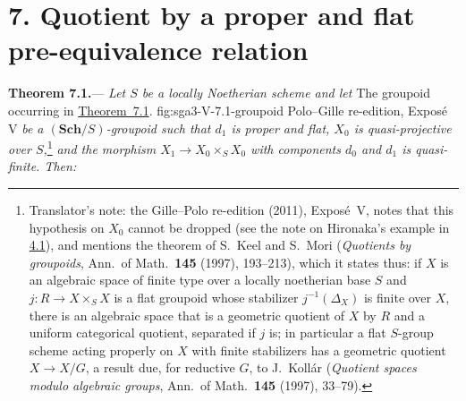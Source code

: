 
\section*{7. Quotient by a proper and flat pre-equivalence relation}
\label{sec:sga3-V-7}

\medskip
{}\label{thm:sga3-V-7.1}%
\noindent\textbf{Theorem 7.1.}---%
\emph{Let \(S\) be a locally Noetherian scheme and let}
  {The groupoid occurring in \hyperref[thm:sga3-V-7.1]{Theorem~7.1}.}
  {fig:sga3-V-7.1-groupoid}
  {Polo--Gille re-edition, Expos\'e V}
\emph{be a \((\mathbf{Sch}/S)\)-groupoid such that \(d_1\) is proper
and flat, \(X_0\) is quasi-projective over \(S\),}\footnote{Translator's note: the Gille--Polo re-edition (2011), Exposé~V, notes
that this hypothesis on \(X_0\) cannot be dropped (see the note on Hironaka's
example in \hyperref[thm:sga3-V-4.1]{4.1}), and mentions the theorem of S.~Keel and S.~Mori
(\emph{Quotients by groupoids}, Ann.\ of Math.\ \textbf{145} (1997), 193--213),
which it states thus: if \(X\) is an algebraic space of finite type over a
locally noetherian base \(S\) and \(j\colon R\to X\times_SX\) is a flat groupoid
whose stabilizer \(j^{-1}(\Delta_X)\) is finite over \(X\), there is an
algebraic space that is a geometric quotient of \(X\) by \(R\) and a uniform
categorical quotient, separated if \(j\) is; in particular a flat \(S\)-group
scheme acting properly on \(X\) with finite stabilizers has a geometric
quotient \(X\to X/G\), a result due, for reductive \(G\), to J.~Kollár
(\emph{Quotient spaces modulo algebraic groups}, Ann.\ of Math.\ \textbf{145}
(1997), 33--79).}
\emph{and the morphism \(X_1\to X_0\times_S X_0\) with components \(d_0\) and
\(d_1\) is quasi-finite. Then:}
